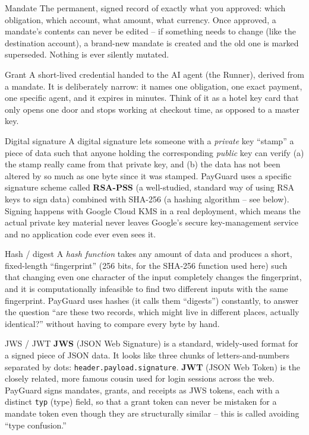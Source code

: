 \documentclass[11pt]{report}
\newcommand{\code}[1]{\texttt{#1}}
\begin{document}
\begin{concept}{Mandate}
The permanent, signed record of exactly what you approved: which
obligation, which account, what amount, what currency. Once approved, a
mandate's contents can never be edited -- if something needs to change
(like the destination account), a brand-new mandate is created and the
old one is marked superseded. Nothing is ever silently mutated.
\end{concept}

\begin{concept}{Grant}
A short-lived credential handed to the AI agent (the Runner), derived
from a mandate. It is deliberately narrow: it names one obligation, one
exact payment, one specific agent, and it expires in minutes. Think of it
as a hotel key card that only opens one door and stops working at
checkout time, as opposed to a master key.
\end{concept}

\begin{concept}{Digital signature}
A digital signature lets someone with a \emph{private} key ``stamp'' a
piece of data such that anyone holding the corresponding \emph{public}
key can verify (a) the stamp really came from that private key, and
(b) the data has not been altered by so much as one byte since it was
stamped. PayGuard uses a specific signature scheme called
\textbf{RSA-PSS} (a well-studied, standard way of using RSA keys to sign
data) combined with SHA-256 (a hashing algorithm -- see below). Signing
happens with Google Cloud KMS in a real deployment, which means the
actual private key material never leaves Google's secure key-management
service and no application code ever even sees it.
\end{concept}

\begin{concept}{Hash / digest}
A \emph{hash function} takes any amount of data and produces a short,
fixed-length ``fingerprint'' (256 bits, for the SHA-256 function used
here) such that changing even one character of the input completely
changes the fingerprint, and it is computationally infeasible to find two
different inputs with the same fingerprint. PayGuard uses hashes (it
calls them ``digests'') constantly, to answer the question ``are these
two records, which might live in different places, actually identical?''
without having to compare every byte by hand.
\end{concept}

\begin{concept}{JWS / JWT}
\textbf{JWS} (JSON Web Signature) is a standard, widely-used format for a
signed piece of JSON data. It looks like three chunks of
letters-and-numbers separated by dots:
\code{header.payload.signature}. \textbf{JWT} (JSON Web Token) is the
closely related, more famous cousin used for login sessions across the
web. PayGuard signs mandates, grants, and receipts as JWS tokens, each
with a distinct \code{typ} (type) field, so that a grant token can never
be mistaken for a mandate token even though they are structurally
similar -- this is called avoiding ``type confusion.''
\end{concept}
\end{document}

